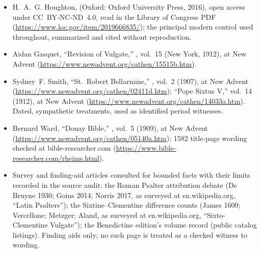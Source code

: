 \begin{itemize}
\item H.~A.~G. Houghton,  (Oxford: Oxford University Press,
2016), open access under CC~BY-NC-ND~4.0, read in the Library of
Congress PDF (\url{https://www.loc.gov/item/2019666835/}); the principal
modern control used throughout, summarized and cited without
reproduction.
\item Aidan Gasquet, ``Revision of Vulgate,'' , vol.~15 (New York, 1912), at New Advent
(\url{https://www.newadvent.org/cathen/15515b.htm}).
\item Sydney~F. Smith, ``St.~Robert Bellarmine,'' , vol.~2 (1907), at New Advent
(\url{https://www.newadvent.org/cathen/02411d.htm}); ``Pope Sixtus V,''
vol.~14 (1912), at New Advent
(\url{https://www.newadvent.org/cathen/14033a.htm}). Dated, sympathetic
treatments, used as identified period witnesses.
\item Bernard Ward, ``Douay Bible,'' ,
vol.~5 (1909), at New Advent
(\url{https://www.newadvent.org/cathen/05140a.htm}); 1582 title-page
wording checked at bible-researcher.com
(\url{https://www.bible-researcher.com/rheims.html}).
\item Survey and finding-aid articles consulted for bounded facts with
their limits recorded in the source audit: the Roman Psalter attribution
debate (De Bruyne 1930; Goins 2014; Norris 2017, as surveyed at
en.wikipedia.org, ``Latin Psalters''); the Sixtine--Clementine
difference counts (James 1600; Vercellone; Metzger; Aland, as surveyed
at en.wikipedia.org, ``Sixto-Clementine Vulgate''); the Benedictine
edition's volume record (public catalog listings). Finding aids only;
no such page is treated as a checked witness to wording.
\end{itemize}
